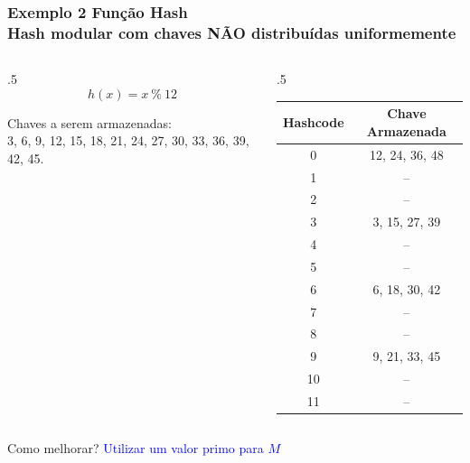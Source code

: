 \documentclass{beamer}
\newcommand{\tcb}[1]{\textcolor{blue}{#1}}
\begin{document}
\begin{frame}
  \frametitle{Exemplo 2 Função Hash\\\small{Hash modular com chaves NÃO distribuídas uniformemente}}

  \begin{columns}
    \begin{column}{.5\textwidth}
      \[ h(x) = x~\%~12 \]

      \center Chaves a serem armazenadas:\\3, 6, 9, 12, 15, 18, 21, 24, 27, 30, 33, 36, 39, 42, 45.
    \end{column}
    \begin{column}{.5\textwidth}

      \begin{table}[]
        \centering
        \small
        \begin{tabular}{@{}cc@{}}
          \toprule
          Hashcode & Chave Armazenada \\ \midrule
          0        & 12, 24, 36, 48   \\
          1        & --               \\
          2        & --               \\
          3        & 3, 15, 27, 39    \\
          4        & --               \\
          5        & --               \\
          6        & 6, 18, 30, 42    \\
          7        & --               \\
          8        & --               \\
          9        & 9, 21, 33, 45    \\
          10       & --               \\
          11       & --               \\ \bottomrule
        \end{tabular}
      \end{table}  
    \end{column}
  \end{columns}

  Como melhorar? \pause \tcb{Utilizar um valor primo para $M$}
\end{frame}
\end{document}
